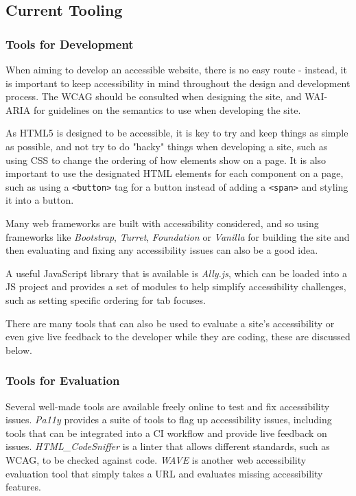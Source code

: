 \documentclass[ %
                    author={Aleena Baig},
                supervisor={Dr Simon Lock},
                    degree={BSc},
                     title={On Making Web Accessible Graphs},
                  subtitle={},
                      year={2019} ]{dissertation}
\begin{document}
\subsection{Current Tooling}

\subsubsection{Tools for Development}

When aiming to develop an accessible website, there is no easy route - instead, it is important to keep accessibility in mind throughout the design and development process. The WCAG should be consulted when designing the site, and WAI-ARIA for guidelines on the semantics to use when developing the site.

As HTML5 is designed to be accessible, it is key to try and keep things as simple as possible, and not try to do "hacky" things when developing a site, such as using CSS to change the ordering of how elements show on a page. It is also important to use the designated HTML elements for each component on a page, such as using a \texttt{<button>} tag for a button instead of adding a \texttt{<span>} and styling it into a button.

Many web frameworks are built with accessibility considered, and so using frameworks like \textit{Bootstrap}, \textit{Turret}, \textit{Foundation} or \textit{Vanilla} for building the site and then evaluating and fixing any accessibility issues can also be a good idea.

A useful JavaScript library that is available is \textit{Ally.js}, which can be loaded into a JS project and provides a set of modules to help simplify accessibility challenges, such as setting specific ordering for tab focuses.

There are many tools that can also be used to evaluate a site's accessibility or even give live feedback to the developer while they are coding, these are discussed below.

\subsubsection{Tools for Evaluation}

Several well-made tools are available freely online to test and fix accessibility issues. \textit{Pa11y} provides a suite of tools to flag up accessibility issues, including tools that can be integrated into a CI workflow and provide live feedback on issues. \textit{HTML\_CodeSniffer} is a linter that allows different standards, such as WCAG, to be checked against code. \textit{WAVE} is another web accessibility evaluation tool that simply takes a URL and evaluates missing accessibility features.
\end{document}
